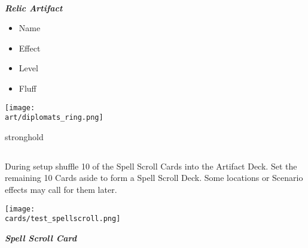 \begin{multicols*}{2}
\begin{multicols*}{2}
\begin{center}
    \vspace{3em}
    \phantom{\ldots}
    \begin{scriptsize}
    \end{scriptsize}\\
    \phantom{\ldots}\textbf{\textit{\textcolor{darkcandyapplered}{Relic Artifact}}}
  \end{center}
\end{multicols*}
\begin{multicols}{2}
  \footnotesize
  \begin{itemize}
    \item[\textbf{1.}] Name
    \item[\textbf{2.}] Effect
    \columnbreak
    \item[\textbf{3.}] Level
    \item[\textbf{4.}] Fluff
  \end{itemize}
\end{multicols}

\begin{center}
  \vspace*{\fill}
  {\texttt{[image: \\art/diplomats\_ring.png]}}
  \vspace*{\fill}
\end{center}

\pagebreak

\begin{expansion}{stronghold}
\subsection*{}

During setup shuffle 10 of the Spell Scroll Cards into the Artifact Deck.
Set the remaining 10 Cards aside to form a Spell Scroll Deck.
Some locations or Scenario effects may call for them later.
\vspace*{1em}

{
    \medskip
    \centering
    \texttt{[image: \\cards/test\_spellscroll.png]}\\
    \medskip
    \footnotesize
    \begin{center}
         \textbf{\textit{\textcolor{darkcandyapplered}{Spell Scroll Card}}}
    \end{center}
}


\end{expansion}
\end{multicols*}
